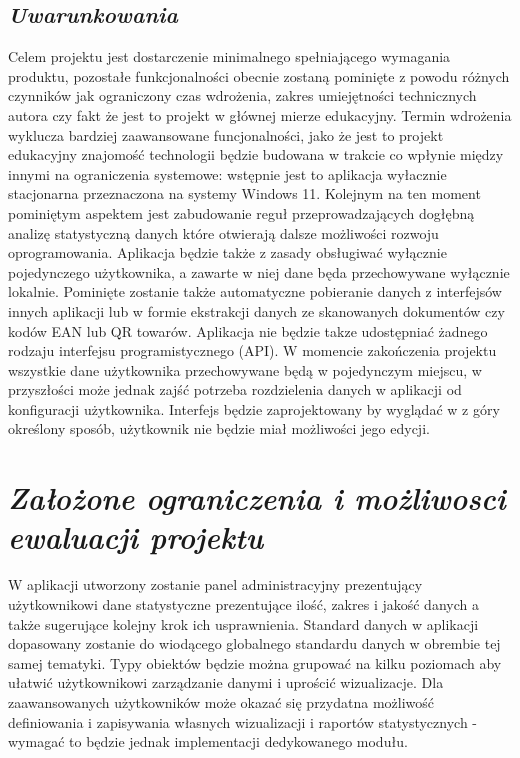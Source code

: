 \documentclass[a4paper,12pt]{report}
\newcommand{\customstylechapter}[1]{\large{\textit{#1}}}
\newcommand{\customstylesection}[1]{\textbf{\textit{#1}}}
\begin{document}
\section{\customstylesection{Uwarunkowania}}
{Celem projektu jest dostarczenie minimalnego spełniającego wymagania produktu, 
pozostałe funkcjonalności obecnie zostaną pominięte z powodu różnych czynników 
jak ograniczony czas wdrożenia, zakres umiejętności technicznych autora czy 
fakt że jest to projekt w głównej mierze edukacyjny.
Termin wdrożenia wyklucza bardziej zaawansowane funcjonalności, jako że jest to 
projekt edukacyjny znajomość technologii będzie budowana w trakcie co wpłynie 
między innymi na ograniczenia systemowe: wstępnie jest to aplikacja wyłacznie 
stacjonarna przeznaczona na systemy Windows 11. Kolejnym na ten moment 
pominiętym aspektem jest zabudowanie reguł przeprowadzających dogłębną analizę 
statystyczną danych które otwierają dalsze możliwości rozwoju oprogramowania. 
Aplikacja będzie także z zasady obsługiwać wyłącznie pojedynczego użytkownika, 
a zawarte w niej dane będa przechowywane wyłącznie lokalnie. Pominięte zostanie 
także automatyczne pobieranie danych z interfejsów innych aplikacji lub w 
formie ekstrakcji danych ze skanowanych dokumentów czy kodów EAN lub QR towarów.
 Aplikacja nie będzie takze udostępniać żadnego rodzaju interfejsu 
programistycznego (API). W momencie zakończenia projektu wszystkie dane 
użytkownika przechowywane będą w pojedynczym miejscu, w przyszłości może jednak 
zajść potrzeba rozdzielenia danych w aplikacji od konfiguracji użytkownika. 
Interfejs będzie zaprojektowany by wyglądać w z góry określony sposób, 
użytkownik nie będzie miał możliwości jego edycji.}
%
\chapter{\customstylechapter{Założone ograniczenia i możliwosci ewaluacji projektu}}
{W aplikacji utworzony zostanie panel administracyjny prezentujący użytkownikowi 
dane statystyczne prezentujące ilość, zakres i jakość danych a także sugerujące 
kolejny krok ich usprawnienia. Standard danych w aplikacji dopasowany zostanie 
do wiodącego globalnego standardu danych w obrembie tej samej tematyki. Typy 
obiektów będzie można grupować na kilku poziomach aby ułatwić użytkownikowi 
zarządzanie danymi i uprościć wizualizacje. Dla zaawansowanych użytkowników 
może okazać się przydatna możliwość definiowania i zapisywania własnych 
wizualizacji i raportów statystycznych - wymagać to będzie jednak implementacji 
dedykowanego modułu.}
\end{document}
